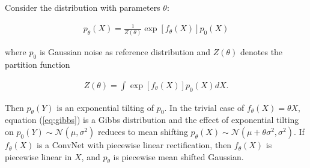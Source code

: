 \documentclass[11pt]{article}
\begin{document}
Consider the distribution with parameters $\theta$:

\begin{eqnarray}
p_\theta(X) = \frac{1}{Z(\theta)} \exp\left[ f_\theta(X)\right] p_0(X)
\label{eq:gibbs}
\end{eqnarray}

where $p_0$ is Gaussian noise as reference distribution and $Z(\theta)$ denotes the partition function

\begin{eqnarray}
Z(\theta) = \int\exp[f_\theta(X)]p_0(X)dX.
\end{eqnarray}

Then $p_\theta(Y)$ is an exponential tilting of $p_0$. In the trivial case of $f_\theta(X)=\theta X$, equation (\ref{eq:gibbs}) is a Gibbs distribution and the effect of exponential tilting on $p_0(Y)\sim\mathcal{N}(\mu,\sigma^2)$ reduces to mean shifting $p_\theta(X)\sim\mathcal{N}(\mu+\theta \sigma^2,\sigma^2)$. If $f_\theta(X)$ is a ConvNet with piecewise linear rectification, then $f_\theta(X)$ is piecewise linear in $X$, and $p_\theta$ is piecewise mean shifted Gaussian. 


 
\end{document}
